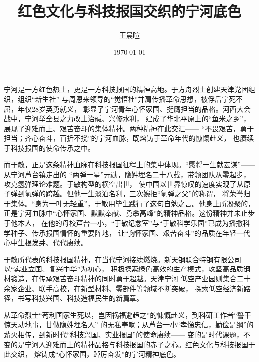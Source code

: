 \documentclass[11pt,a4paper]{ctexart}
\title{红色文化与科技报国交织的宁河底色}
\author{王晨暄}
\date{\today}
\begin{document}
\maketitle

宁河是一方红色热土，更是一方科技报国的精神高地。于方舟烈士创建天津党团组织，组织“新生社”
与周恩来领导的“觉悟社”并肩传播革命思想，被俘后宁死不屈，年仅28岁英勇就义，
彰显了宁河青年心怀家国、挺膺担当的品格。河西大会战中，宁河举全县之力改土治碱、兴修水利，
建成了华北平原上的“鱼米之乡”，展现了迎难而上、艰苦奋斗的集体精神。两种精神在此交汇——
“不畏艰苦，勇于担当；齐心奋斗，百折不挠”的宁河血脉，既熔铸于革命年代的慷慨赴义，
也赓续于科技报国的使命传承之中。

而于敏，正是这条精神血脉在科技报国征程上的集中体现。“愿将一生献宏谋”——从宁河芦台镇走出的
“两弹一星”元勋，隐姓埋名二十八载，带领团队从零起步，攻克氢弹理论难题。于敏构型的横空出世，
使中国以世界惊叹的速度实现了从原子弹到氢弹的跨越。但他一生淡泊名利，三次婉拒“氢弹之父”的称谓，
将荣誉归于集体。“身为一叶无轻重”，于敏用毕生践行了这句自勉之言。他身上所凝聚的，
正是宁河血脉中“心怀家国、默默奉献、勇攀高峰”的精神品格。这份精神并未止步于他本人，
在他的母校芦台一小，“于敏纪念室”与“于敏科学乐园”已成为播撒科学种子、传承报国情怀的重要阵地，
让“胸怀家国、艰苦奋斗”的品质在年轻一代心中生根发芽、代代赓续。

于敏所代表的科技报国精神，在当代宁河接续燃烧。新天钢联合特钢有限公司以“实业立国、复兴中华”为初心，
积极探索绿色高效的生产模式，攻坚高品质钢材锻造，在传承艰苦奋斗精神的同时勇于超越。天津宁河
低空产业园则集合二十余家企业、联手高校，在新型材料、零部件等领域不断突破，
探索低空经济新路径，书写科技兴国、科技造福民生的新篇章。

从革命烈士“苟利国家生死以，岂因祸福避趋之”的慷慨赴义，到科研工作者“誓干惊天动地事，甘做隐姓埋名人”
的无私奉献；从芦台一小“孝悌忠信，勤俭是纲”的薪火相传，到新时代“科技兴国、实业报国”的使命赓续——
变的是时代课题，不变的是宁河人迎难而上的精神品格与科技报国的赤子之心。红色文化与科技报国于此交织，
熔铸成“心怀家国，踔厉奋发”的宁河精神底色。
\end{document}
